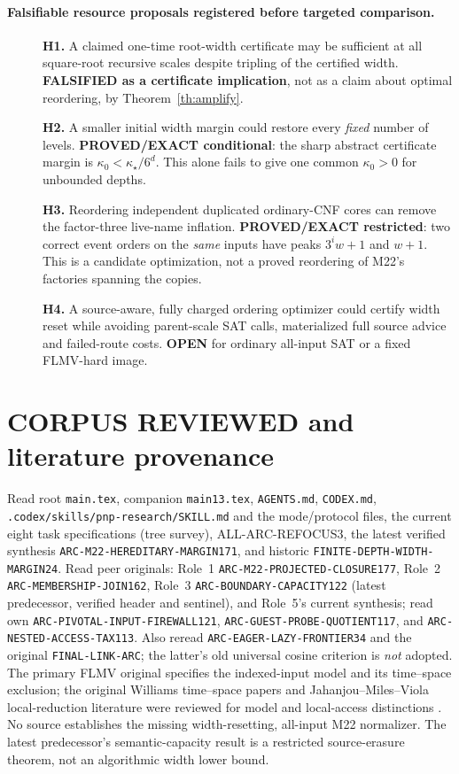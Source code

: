 \documentclass[11pt]{article}
\begin{document}
\paragraph{Falsifiable resource proposals registered before targeted comparison.}
\begin{description}
\item[] \textbf{H1.} A claimed one-time root-width certificate may be
sufficient at all square-root recursive scales despite tripling of the
certified width.  \textbf{FALSIFIED as a certificate implication}, not as
a claim about optimal reordering, by Theorem~\ref{th:amplify}.
\item[] \textbf{H2.} A smaller initial width margin could restore every
\emph{fixed} number of levels.  \textbf{PROVED/EXACT conditional}: the
sharp abstract certificate margin is $\kappa_0<\kappa_\star/6^d$.
This alone fails to give one common $\kappa_0>0$ for unbounded depths.
\item[] \textbf{H3.} Reordering independent duplicated ordinary-CNF
cores can remove the factor-three live-name inflation.
\textbf{PROVED/EXACT restricted}: two correct event orders on the
\emph{same} inputs have peaks $3^iw+1$ and $w+1$.
This is a candidate optimization, not a proved reordering of
M22's factories spanning the copies.
\item[] \textbf{H4.} A source-aware, fully charged ordering optimizer
could certify width reset while avoiding parent-scale SAT calls,
materialized full source advice and failed-route costs.
\textbf{OPEN} for ordinary all-input SAT or a fixed FLMV-hard image.
\end{description}

\section{CORPUS REVIEWED and literature provenance}
Read root \texttt{main.tex}, companion \texttt{main13.tex},
\texttt{AGENTS.md}, \texttt{CODEX.md},
\texttt{.codex/skills/pnp-research/SKILL.md} and the mode/protocol files,
the current eight task specifications (tree survey), ALL-ARC-REFOCUS3,
the latest verified synthesis
\texttt{ARC-M22-HEREDITARY-MARGIN171}, and historic
\texttt{FINITE-DEPTH-WIDTH-MARGIN24}.  Read peer originals:
Role~1 \texttt{ARC-M22-PROJECTED-CLOSURE177},
Role~2 \texttt{ARC-MEMBERSHIP-JOIN162},
Role~3 \texttt{ARC-BOUNDARY-CAPACITY122} (latest predecessor, verified
header and sentinel), and Role~5's current synthesis; read own
\texttt{ARC-PIVOTAL-INPUT-FIREWALL121},
\texttt{ARC-GUEST-PROBE-QUOTIENT117}, and
\texttt{ARC-NESTED-ACCESS-TAX113}.
Also reread \texttt{ARC-EAGER-LAZY-FRONTIER34} and the original
\texttt{FINAL-LINK-ARC}; the latter's old universal cosine
criterion is \emph{not} adopted.
The primary FLMV original specifies the indexed-input model and its
time--space exclusion; the original Williams time--space papers and
Jahanjou--Miles--Viola local-reduction literature were reviewed for
model and local-access distinctions \cite{FLMV,Williams,JMV}.
No source establishes the missing width-resetting, all-input
M22 normalizer.  The latest predecessor's semantic-capacity result
is a restricted source-erasure theorem, not an algorithmic width
lower bound.
\end{document}
